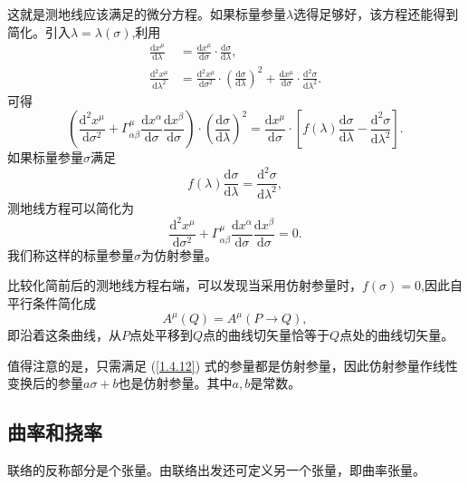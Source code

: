 \documentclass[11pt, a4paper, oneside, onecolumn]{ctexart}
\numberwithin{equation}{subsection}
\begin{document}
这就是测地线应该满足的微分方程。如果标量参量$\lambda$选得足够好，该方程还能得到简化。引入$\lambda=\lambda\left(\sigma\right)$,利用
\begin{align}
\frac{\mathrm{d}x^{\mu}}{\mathrm{d}\lambda}&=\frac{\mathrm{d}x^{\mu}}{\mathrm{d}\sigma}\cdot\frac{\mathrm{d}\sigma}{\mathrm{d}\lambda},\\
\frac{\mathrm{d}^{2}x^{\mu}}{\mathrm{d}\lambda^{2}}&=\frac{\mathrm{d}^{2}x^{\mu}}{\mathrm{d}\sigma^{2}}\cdot\left(\frac{\mathrm{d}\sigma}{\mathrm{d}\lambda}\right)^{2}+\frac{\mathrm{d}x^{\mu}}{\mathrm{d}\sigma}\cdot\frac{\mathrm{d}^{2}\sigma}{\mathrm{d}\lambda^{2}}.
\end{align}
可得
\begin{equation}
\left(\frac{\mathrm{d}^{2}x^{\mu}}{\mathrm{d}\sigma^{2}}+\Gamma_{\alpha\beta}^{\mu}\frac{\mathrm{d}x^{\alpha}}{\mathrm{d}\sigma}\frac{\mathrm{d}x^{\beta}}{\mathrm{d}\sigma}\right)\cdot\left(\frac{\mathrm{d}\sigma}{\mathrm{d}\lambda}\right)^{2}=\frac{\mathrm{d}x^{\mu}}{\mathrm{d}\sigma}\cdot\left[f\left(\lambda\right)\frac{\mathrm{d}\sigma}{\mathrm{d}\lambda}-\frac{\mathrm{d}^{2}\sigma}{\mathrm{d}\lambda^{2}}\right].
\end{equation}
如果标量参量$\sigma$满足
\begin{equation}
f\left(\lambda\right)\frac{\mathrm{d}\sigma}{\mathrm{d}\lambda}=\frac{\mathrm{d}^{2}\sigma}{\mathrm{d}\lambda^{2}},\label{1.4.12}
\end{equation}
测地线方程可以简化为
\begin{equation}
\frac{\mathrm{d}^{2}x^{\mu}}{\mathrm{d}\sigma^{2}}+\Gamma_{\alpha\beta}^{\mu}\frac{\mathrm{d}x^{\alpha}}{\mathrm{d}\sigma}\frac{\mathrm{d}x^{\beta}}{\mathrm{d}\sigma}=0.
\end{equation}
我们称这样的标量参量$\sigma$为仿射参量。

比较化简前后的测地线方程右端，可以发现当采用仿射参量时，$f\left(\sigma\right)=0$,因此自平行条件简化成
\begin{equation}
A^{\mu}\left(Q\right)=A^{\mu}\left(P\to Q\right),
\end{equation}
即沿着这条曲线，从$P$点处平移到$Q$点的曲线切矢量恰等于$Q$点处的曲线切矢量。

值得注意的是，只需满足 (\ref{1.4.12}) 式的参量都是仿射参量，因此仿射参量作线性变换后的参量$a\sigma+b$也是仿射参量。其中$a,b$是常数。

\subsection{曲率和挠率}
联络的反称部分是个张量。由联络出发还可定义另一个张量，即曲率张量。
\end{document}
